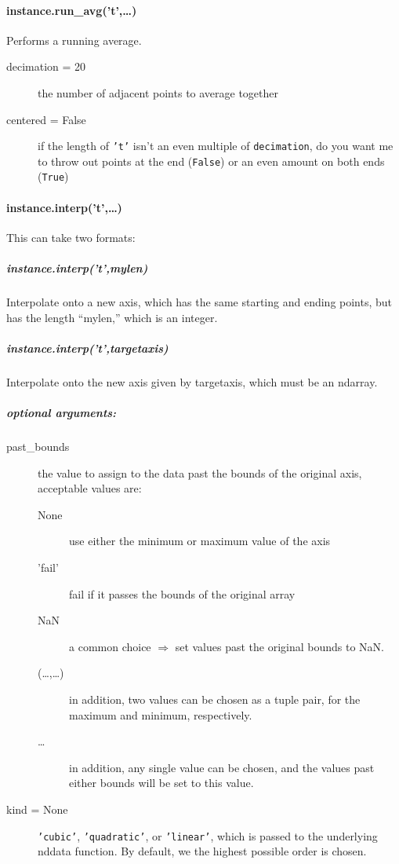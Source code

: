 \paragraph{instance.run\_avg('t',\ldots)}
Performs a running average.
\begin{mykwargs}
    \begin{description}
        \item[decimation = 20] the number of adjacent points to average together
        \item[centered = False] if the length of \texttt{'t'} isn't an even multiple of \texttt{decimation}, do you want me to throw out points at the end (\texttt{False}) or an even amount on both ends (\texttt{True})
    \end{description}
\end{mykwargs}
\paragraph{instance.interp('t',\ldots)}
This can take two formats:
\subparagraph{instance.interp('t',mylen)}
Interpolate onto a new axis, which has the same starting and ending points, but has the length ``mylen,'' which is an integer.
\subparagraph{instance.interp('t',targetaxis)}
Interpolate onto the new axis given by targetaxis, which must be an ndarray.
\subparagraph{optional arguments:}
\begin{mykwargs}
    \begin{description}
        \item[past\_bounds] the value to assign to the data past the bounds of the original axis, acceptable values are:
            \begin{description}
                \item[None] use either the minimum or maximum value of the axis
                \item['fail'] fail if it passes the bounds of the original array 
                \item[NaN] a common choice $\Rightarrow$ set values past the original bounds to NaN. 
                \item[(\ldots,\ldots)] in addition, two values can be chosen as a tuple pair, for the maximum and minimum, respectively.
                \item[\ldots] in addition, any single value can be chosen, and the values past either bounds will be set to this value.
            \end{description}
        \item[kind = None] \texttt{'cubic'}, \texttt{'quadratic'}, or \texttt{'linear'}, which is passed to the underlying nddata function.
            By default, we the highest possible order is chosen.
    \end{description}
\end{mykwargs}
